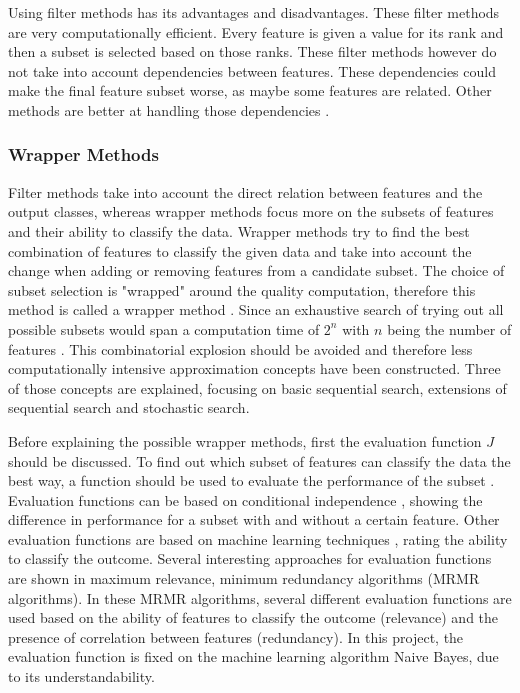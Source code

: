 \documentclass[10pt,a4paper]{report}
\begin{document}
	Using filter methods has its advantages and disadvantages. These filter methods are very computationally efficient. Every feature is given a value for its rank and then a subset is selected based on those ranks. These filter methods however do not take into account dependencies between features. These dependencies could make the final feature subset worse, as maybe some features are related. Other methods are better at handling those dependencies \cite{Duch2006, saeys2007review}.
	
	\subsubsection{Wrapper Methods}
	\label{FSsubsec:WrapperMethods}
	
	Filter methods take into account the direct relation between features and the output classes, whereas wrapper methods focus more on the subsets of features and their ability to classify the data. Wrapper methods try to find the best combination of features to classify the given data and take into account the change when adding or removing features from a candidate subset. The choice of subset selection is "wrapped"  around the quality computation, therefore this method is called a wrapper method \cite{Reunanen2006}. Since an exhaustive search of trying out all possible subsets would span a computation time of $2^n$ with $n$ being the number of features \cite{Alsallakh2016PowerSet}. This combinatorial explosion should be avoided and therefore less computationally intensive approximation concepts have been constructed. Three of those concepts are explained, focusing on basic sequential search, extensions of sequential search and stochastic search.
	
	Before explaining the possible wrapper methods, first the evaluation function $J$ should be discussed. To find out which subset of features can classify the data the best way, a function should be used to evaluate the performance of the subset \cite{Reunanen2006}. Evaluation functions can be based on conditional independence \cite{Reunanen2006,tsamardinos2017massively}, showing the difference in performance for a subset with and without a certain feature. Other evaluation functions are based on machine learning techniques \cite{huang2013automated, saeys2007review}, rating the ability to classify the outcome. Several interesting approaches for evaluation functions are shown in maximum relevance, minimum redundancy algorithms \cite{SENAWI201747, el2009new, radovic2017minimum} (MRMR algorithms). In these MRMR algorithms, several different evaluation functions are used based on the ability of features to classify the outcome (relevance) and the presence of correlation between features (redundancy). In this project, the evaluation function is fixed on the machine learning algorithm Naive Bayes, due to its understandability.
	
\end{document}

